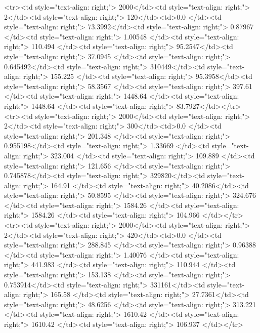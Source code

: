 <tr><td style="text-align: right;">      2000</td><td style="text-align: right;">         2</td><td style="text-align: right;">           120</td><td>0.0          </td><td style="text-align: right;">                73.3992</td><td style="text-align: right;">           0.87967 </td><td style="text-align: right;">         1.00548 </td><td style="text-align: right;">        110.494 </td><td style="text-align: right;">            95.2547</td><td style="text-align: right;">              37.0945  </td><td style="text-align: right;">             0.645492</td><td style="text-align: right;">              310449</td><td style="text-align: right;">                      155.225 </td><td style="text-align: right;">            95.3958</td><td style="text-align: right;">                58.3567 </td><td style="text-align: right;">       397.61  </td><td style="text-align: right;">   1448.64 </td><td style="text-align: right;">      1448.64 </td><td style="text-align: right;">                 83.7927</td></tr>
<tr><td style="text-align: right;">      2000</td><td style="text-align: right;">         2</td><td style="text-align: right;">           300</td><td>0.0          </td><td style="text-align: right;">               201.348 </td><td style="text-align: right;">           0.955198</td><td style="text-align: right;">         1.33669 </td><td style="text-align: right;">        323.004 </td><td style="text-align: right;">           109.889 </td><td style="text-align: right;">             121.656   </td><td style="text-align: right;">             0.745878</td><td style="text-align: right;">              329820</td><td style="text-align: right;">                      164.91  </td><td style="text-align: right;">            40.2086</td><td style="text-align: right;">                50.8595 </td><td style="text-align: right;">       324.676 </td><td style="text-align: right;">   1584.26 </td><td style="text-align: right;">      1584.26 </td><td style="text-align: right;">                104.966 </td></tr>
<tr><td style="text-align: right;">      2000</td><td style="text-align: right;">         2</td><td style="text-align: right;">           420</td><td>0.0          </td><td style="text-align: right;">               288.845 </td><td style="text-align: right;">           0.96388 </td><td style="text-align: right;">         1.40076 </td><td style="text-align: right;">        441.983 </td><td style="text-align: right;">           110.944 </td><td style="text-align: right;">             153.138   </td><td style="text-align: right;">             0.753914</td><td style="text-align: right;">              331161</td><td style="text-align: right;">                      165.58  </td><td style="text-align: right;">            27.7361</td><td style="text-align: right;">                48.6256 </td><td style="text-align: right;">       313.221 </td><td style="text-align: right;">   1610.42 </td><td style="text-align: right;">      1610.42 </td><td style="text-align: right;">                106.937 </td></tr>
